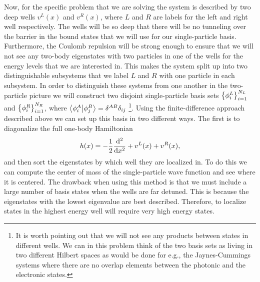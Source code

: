 \documentclass[twocolumn,superscriptaddress,unsortedaddress,
 amsmath,amssymb,
 aps,
]{revtex4-2}
\begin{document}
        Now, for the specific problem that  we are solving the system is described
        by two deep wells $v^{L}(x)$ and $v^{R}(x)$, where $L$ and $R$ are labels
        for the left and right well respectively.
        The wells will be so deep that there will be no tunneling over the
        barrier in the bound states that we will use for our single-particle
        basis.
        Furthermore, the Coulomb repulsion will be strong enough to ensure that
        we will not see any two-body eigenstates with two particles in one of
        the wells for the energy levels that we are interested in.
        This makes the system split up into two distinguishable subsystems
        that we label $L$ and $R$ with one particle in each subsystem.
        In order to distinguish these systems from one another in the
        two-particle picture we will construct two disjoint single-particle
        basis sets $\qty{\phi^{L}_{i}}_{i = 1}^{N_L}$ and
        $\qty{\phi^{R}_{i}}_{i = 1}^{N_R}$, where
        $\braket{\phi^{A}_{i}}{\phi^{B}_{j}} = \delta^{AB} \delta_{ij}$
        \footnote{
            It is worth pointing out that we will not see any products
            between states in different wells.
            We can in this problem think of the two basis sets as living in
            two different Hilbert spaces as would be done for e.g., the
            Jaynes-Cummings systems where there are no overlap elements
            between the photonic and the electronic states.
        }.
        Using the finite-difference approach described above we can set up this
        basis in two different ways.
        The first is to diagonalize the full one-body Hamiltonian
        \begin{align*}
            h(x) = -\frac{1}{2} \dv[2]{}{x} + v^{L}(x) + v^{R}(x),
        \end{align*}
        and then sort the eigenstates by which well they are localized in.
        To do this we can compute the center of mass of the single-particle
        wave function and see where it is centered.
        The drawback when using this method is that we must include a large
        number of basis states when the wells are far detuned.
        This is because the eigenstates with the lowest eigenvalue are best
        described.
        Therefore, to localize states in the highest energy well will require
        very high energy states.
\end{document}
